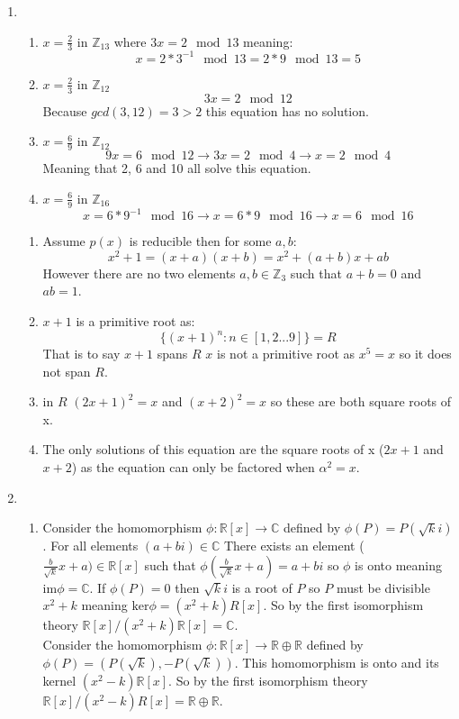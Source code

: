 \documentclass[11pt] {article}
\newcommand{\C}{\mathbb{C}}
\newcommand{\R}{\mathbb{R}}
\newcommand{\Z}{\mathbb{Z}}
\begin{document}
\begin{enumerate}
\begin{enumerate}
	\end{enumerate}
	\item
	\begin{enumerate}
		\item $x = \frac{2}{3} $ in $\Z_{13}$ where $3x = 2 \mod 13$ meaning:
			$$x = 2*3^{-1} \mod 13 = 2*9 \mod 13 = 5$$
		\item $x = \frac{2}{3} $ in $\Z_{12}$
			$$ 3x = 2 \mod 12$$
			Because $gcd(3,12) = 3 > 2$ this equation has no solution.
		\item $x = \frac{6}{9}$ in $\Z_{12}$
			$$ 9x = 6 \mod 12 \rightarrow 3x = 2 \mod 4 \rightarrow x = 2 \mod 4$$
			Meaning that 2, 6 and 10 all solve this equation.
		\item $ x = \frac{6}{9}$ in $\Z_{16}$
			$$ x = 6*9^{-1} \mod 16 \rightarrow x = 6 * 9 \mod 16 \rightarrow x = 6 \mod 16$$
	\end{enumerate}
	\begin{enumerate}
		\item Assume $p(x)$ is reducible then for some $a,b$:
			$$ x^2 + 1 = (x + a)(x + b) = x^2 + (a + b)x + ab $$
	However there are no two elements $a,b \in \Z_3$ such that $a + b = 0$ and $ab = 1$.
\item $x+1$ is a primitive root as:
	$$ \{(x+1)^n: n \in [1,2...9]\} = R$$
	That is to say $x+1$ spans $R$
      $x$ is not a primitive root as $x^5 = x$ so it does not span $R$.
		\item in $R$ $(2x+1)^2 = x$ and $(x+2)^2 = x$ so these are both square roots of x.
		\item The only solutions of this equation are the square roots of x ($2x+1$ and $x+2$) as the equation can only be factored when $\alpha^2 = x$.
	\end{enumerate}
\item 
	\begin{enumerate}
		\item Consider the homomorphism $\phi:\R[x] \rightarrow \C$ defined by $\phi(P) =P(\sqrt{k}i)$. For all elements $(a + bi) \in \C$ There exists an element ($\frac{b}{\sqrt{k}}x + a) \in \R[x]$ such that $\phi(\frac{b}{\sqrt{k}}x + a) = a + bi$ so $\phi$ is onto meaning $\text{im}\phi = \C$. If $\phi(P) = 0$ then $\sqrt{k}i$ is a root of $P$ so $P$ must be divisible $x^2 +k$ meaning $\text{ker} \phi = (x^2+k)R[x]$. So by the first isomorphism theory $\R[x]/(x^2+k)\R[x] = \C$. \\
			Consider the homomorphism $\phi:\R[x] \rightarrow \R \oplus \R$ defined by $\phi(P) = (P(\sqrt{k}),-P(\sqrt{k}))$. This homomorphism is onto and its kernel $(x^2 -k)\R[x]$. So by the first isomorphism theory $\R[x]/(x^2-k)R[x] = \R \oplus \R$.

\end{enumerate}
\end{enumerate}
\end{document}
